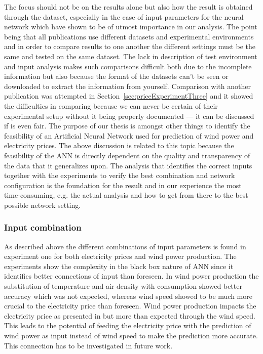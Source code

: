 The focus should not be on the results alone but also how the result is obtained through the dataset, especially in the case of input parameters for the neural network which have shown to be of utmost importance in our analysis. The point being that all publications use different datasets and experimental environments and in order to compare results to one another the different settings must be the same and tested on the same dataset. The lack in description of test environment and input analysis makes such comparisons difficult both due to the incomplete information but also because the format of the datasets can't be seen or downloaded to extract the information from yourself. Comparison with another publication was attempted in Section~\ref{sec:priceExperimentThree} and it showed the difficulties in comparing because we can never be certain of their experimental setup without it being properly documented --- it can be discussed if is even fair. The purpose of our thesis is amongst other things to identify the feasibility of an Artificial Neural Network used for prediction of wind power and electricity prices. The above discussion is related to this topic because the feasibility of the ANN is directly dependent on the quality and transparency of the data that it generalizes upon. The analysis that identifies the correct inputs together with the experiments to verify the best combination and network configuration is the foundation for the result and in our experience the most time-consuming, e.g. the actual analysis and how to get from there to the best possible network setting.

\subsubsection{Input combination}
As described above the different combinations of input parameters is found in experiment one for both electricity prices and wind power production. The experiments show the complexity in the black box nature of ANN since it identifies better connections of input than foreseen. In wind power production the substitution of temperature and air density with consumption showed better accuracy which was not expected, whereas wind speed showed to be much more crucial to the electricity price than foreseen. Wind power production impacts the electricity price as presented in \cite{dayAheadImpactOfWindPowerForecasts} but more than expected through the wind speed. This leads to the potential of feeding the electricity price with the prediction of wind power as input instead of wind speed to make the prediction more accurate. This connection has to be investigated in future work.


